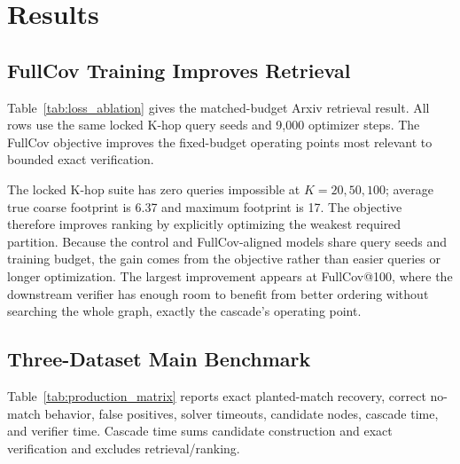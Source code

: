 \documentclass[runningheads]{llncs}
\begin{document}
\section{Results}

\subsection{FullCov Training Improves Retrieval}

Table~\ref{tab:loss_ablation} gives the matched-budget Arxiv retrieval result. All rows use the same locked K-hop query seeds and 9,000 optimizer steps. The FullCov objective improves the fixed-budget operating points most relevant to bounded exact verification.

\begin{table}[H]
\centering
\caption{\textbf{Matched Arxiv retrieval objective ablation.} Fixed retrieval budgets on $n{=}400$ locked K-hop queries (200 per query seed); each row averages the validation-selected checkpoint from two independent training replicates.}
\label{tab:loss_ablation}
\small
\setlength{\tabcolsep}{5pt}
\end{table}

The locked K-hop suite has zero queries impossible at $K=20,50,100$; average true coarse footprint is 6.37 and maximum footprint is 17. The objective therefore improves ranking by explicitly optimizing the weakest required partition. Because the control and FullCov-aligned models share query seeds and training budget, the gain comes from the objective rather than easier queries or longer optimization. The largest improvement appears at FullCov@100, where the downstream verifier has enough room to benefit from better ordering without searching the whole graph, exactly the cascade's operating point.

\clearpage
\begin{samepage}
\subsection{Three-Dataset Main Benchmark}

Table~\ref{tab:production_matrix} reports exact planted-match recovery, correct no-match behavior, false positives, solver timeouts, candidate nodes, cascade time, and verifier time. Cascade time sums candidate construction and exact verification and excludes retrieval/ranking.
\end{samepage}
\end{document}
